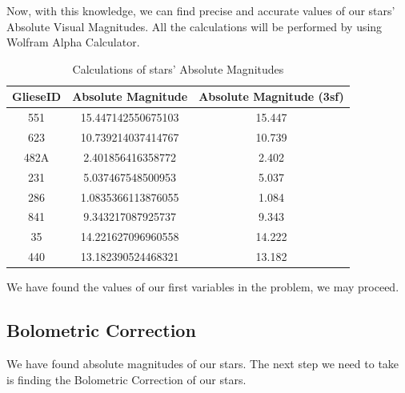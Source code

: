 \documentclass[a4paper,12pt]{article}
\begin{document}
  Now, with this knowledge, we can find precise and accurate values of our stars' Absolute Visual Magnitudes. All the calculations will
 be performed by using Wolfram Alpha Calculator.
\begin{table}[h!]
    \begin{center}
      \caption{Calculations of stars' Absolute Magnitudes}
      \begin{tabular}{c | c | c}
        \textbf{GlieseID} & \textbf{Absolute Magnitude} & \textbf{Absolute Magnitude (3sf)}\\
        \hline
        551 & 15.447142550675103 & 15.447\\
        623 & 10.739214037414767 & 10.739\\
        482A & 2.401856416358772 & 2.402\\
        231 & 5.037467548500953 & 5.037\\
        286 & 1.0835366113876055 & 1.084\\
        841 & 9.343217087925737 & 9.343\\
        35& 14.221627096960558 & 14.222\\
        440 & 13.182390524468321 & 13.182\\
        
      \end{tabular}
      \label{avm}
    \end{center}
  \end{table}
  
We have found the values of our first variables in the problem, we may proceed.

\subsection{Bolometric Correction}

We have found absolute magnitudes of our stars. The next step we need to take is finding the Bolometric Correction of our stars.











  
  \singlespacing
  \newpage
  \tiny
  \appendix
\end{document}
